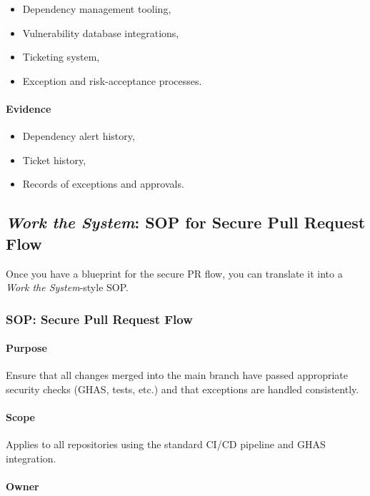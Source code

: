 \documentclass[11pt]{article}
\begin{document}
\begin{itemize}
  \item Dependency management tooling,
  \item Vulnerability database integrations,
  \item Ticketing system,
  \item Exception and risk-acceptance processes.
\end{itemize}

\paragraph{Evidence}

\begin{itemize}
  \item Dependency alert history,
  \item Ticket history,
  \item Records of exceptions and approvals.
\end{itemize}

\subsection{\emph{Work the System}: SOP for Secure Pull Request Flow}

Once you have a blueprint for the secure PR flow, you can
translate it into a \emph{Work the System}-style SOP.

\subsubsection*{SOP: Secure Pull Request Flow}

\paragraph{Purpose}

Ensure that all changes merged into the main branch have passed
appropriate security checks (GHAS, tests, etc.) and that
exceptions are handled consistently.

\paragraph{Scope}

Applies to all repositories using the standard CI/CD pipeline
and GHAS integration.

\paragraph{Owner}
\end{document}

